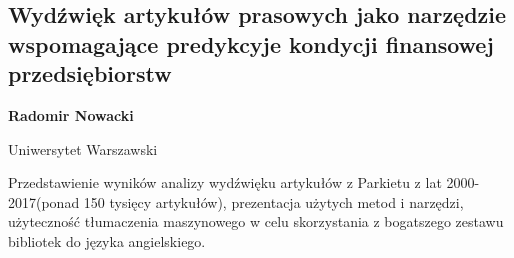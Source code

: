 \documentclass[\main/boa.tex]{subfiles}
\begin{document}
\subsection{Wydźwięk artykułów prasowych jako narzędzie wspomagające predykcyje kondycji finansowej przedsiębiorstw}

\begin{minipage}{0.915\textwidth}
	\centering
  {\bf {} Radomir Nowacki}
\end{minipage}

\vskip 0.3cm

\begin{affiliations}
\begin{minipage}{0.915\textwidth}
\centering
Uniwersytet Warszawski  \\[-2pt]
\end{minipage}
\end{affiliations}

\vskip 0.8cm

 Przedstawienie wyników analizy wydźwięku artykułów z Parkietu z lat 2000-2017(ponad 150 tysięcy artykułów), prezentacja użytych metod i narzędzi, użyteczność tłumaczenia maszynowego w celu skorzystania z bogatszego zestawu bibliotek do języka angielskiego. 
\end{document}
